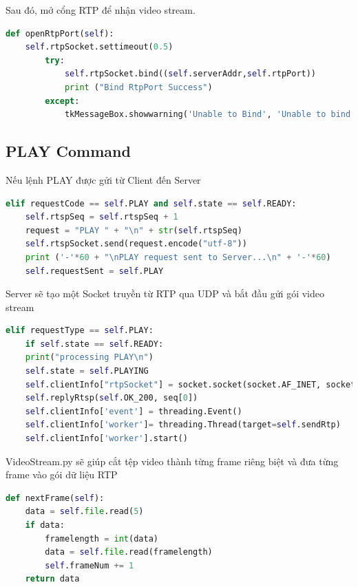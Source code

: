 \documentclass[a4paper]{article}
\begin{document}
Sau đó, mở cổng RTP để nhận video stream.
\begin{lstlisting}[language=Python]
def openRtpPort(self):
    self.rtpSocket.settimeout(0.5)
        try:
            self.rtpSocket.bind((self.serverAddr,self.rtpPort))
            print ("Bind RtpPort Success")
        except:
            tkMessageBox.showwarning('Unable to Bind', 'Unable to bind PORT=%d' %self.rtpPort)
\end{lstlisting}

\subsection{PLAY Command}
Nếu lệnh PLAY được gửi từ Client đến Server
\begin{lstlisting}[language=Python]
elif requestCode == self.PLAY and self.state == self.READY:
    self.rtspSeq = self.rtspSeq + 1
    request = "PLAY " + "\n" + str(self.rtspSeq)
    self.rtspSocket.send(request.encode("utf-8"))
    print ('-'*60 + "\nPLAY request sent to Server...\n" + '-'*60)
    self.requestSent = self.PLAY
\end{lstlisting}
Server sẽ tạo một Socket truyền từ RTP qua UDP và bắt đầu gửi gói video stream
\begin{lstlisting}[language=Python]
elif requestType == self.PLAY:
    if self.state == self.READY:
    print("processing PLAY\n")
    self.state = self.PLAYING
    self.clientInfo["rtpSocket"] = socket.socket(socket.AF_INET, socket.SOCK_DGRAM)
    self.replyRtsp(self.OK_200, seq[0])
    self.clientInfo['event'] = threading.Event()
    self.clientInfo['worker']= threading.Thread(target=self.sendRtp)
    self.clientInfo['worker'].start()
\end{lstlisting}
VideoStream.py sẽ giúp cắt tệp video thành từng frame riêng biệt và đưa từng frame vào gói dữ liệu RTP
\begin{lstlisting}[language=Python]
def nextFrame(self):
    data = self.file.read(5)
    if data: 
        framelength = int(data)
        data = self.file.read(framelength)
        self.frameNum += 1
    return data
\end{lstlisting}
\end{document}
